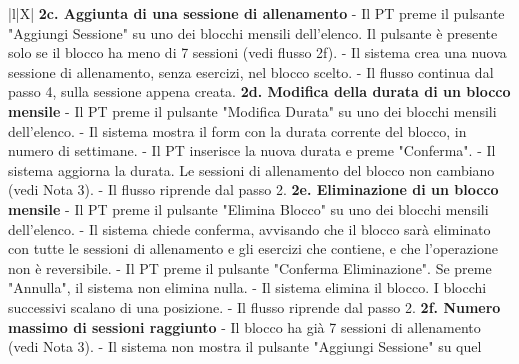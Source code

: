 \documentclass[../../../../SoftwareRequirementsSpecification.tex]{subfiles}
\begin{document}
\begin{xltabular}{\textwidth}{|l|X|}
{    \textbf{2c. Aggiunta di una sessione di allenamento} \newline
    - Il PT preme il pulsante "Aggiungi Sessione" su uno dei blocchi
    mensili dell'elenco. Il pulsante è presente solo se il blocco ha
    meno di 7 sessioni (vedi flusso 2f). \newline
    - Il sistema crea una nuova sessione di allenamento, senza
    esercizi, nel blocco scelto. \newline
    - Il flusso continua dal passo 4, sulla sessione appena creata.
    \newline
    \newline
    \textbf{2d. Modifica della durata di un blocco mensile}
    \newline
    - Il PT preme il pulsante "Modifica Durata" su uno dei blocchi
    mensili dell'elenco. \newline
    - Il sistema mostra il form con la durata corrente del blocco, in
    numero di settimane. \newline
    - Il PT inserisce la nuova durata e preme "Conferma". \newline
    - Il sistema aggiorna la durata. Le sessioni di allenamento del
    blocco non cambiano (vedi Nota 3). \newline
    - Il flusso riprende dal passo 2. \newline
    \newline
    \textbf{2e. Eliminazione di un blocco mensile} \newline
    - Il PT preme il pulsante "Elimina Blocco" su uno dei blocchi
    mensili dell'elenco. \newline
    - Il sistema chiede conferma, avvisando che il blocco sarà
    eliminato con tutte le sessioni di allenamento e gli esercizi
    che contiene, e che l'operazione non è reversibile. \newline
    - Il PT preme il pulsante "Conferma Eliminazione". Se preme
    "Annulla", il sistema non elimina nulla. \newline
    - Il sistema elimina il blocco. I blocchi successivi scalano di
    una posizione. \newline
    - Il flusso riprende dal passo 2. \newline
    \newline
    \textbf{2f. Numero massimo di sessioni raggiunto} \newline
    - Il blocco ha già 7 sessioni di allenamento (vedi Nota 3).
    \newline
    - Il sistema non mostra il pulsante "Aggiungi Sessione" su quel
}
\end{xltabular}
\end{document}
